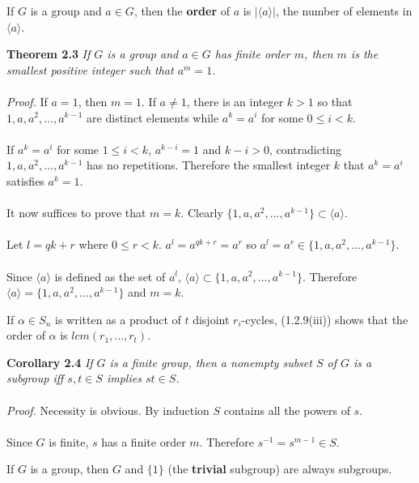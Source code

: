 \documentclass{article}
\begin{document}
If \(G\) is a group and \(a\in G\), then the \textbf{order} of \(a\) is \(|\langle a\rangle|\), the number of elements in \(\langle a\rangle\).\\
\begin{redrules}\color{red}
\textbf{Theorem 2.3} \textit{If \(G\) is a group and \(a\in G\) has finite order \(m\), then \(m\) is the smallest positive integer such that \(a^{m}=1\).}\\\\\color{black}
\textit{Proof.} If \(a=1\), then \(m=1\). If \(a\neq 1\), there is an integer \(k>1\) so that \(1,a,a^{2},...,a^{k-1}\) are distinct elements 
while \(a^{k}=a^{i}\) for some \(0\le i<k\).\\\\
If \(a^{k}=a^{i}\) for some \(1\le i<k\), \(a^{k-i}=1\) and \(k-i>0\), contradicting \(1,a,a^{2},...,a^{k-1}\) has no repetitions. Therefore the smallest integer \(k\) that \(a^{k}=a^{i}\) satisfies \(a^{k}=1\).\\\\
It now suffices to prove that \(m=k\). Clearly \(\{1,a,a^{2},...,a^{k-1}\}\subset\langle a\rangle\).\\\\
Let \(l=qk+r\) where \(0\le r<k\). \(a^{l}=a^{qk+r}=a^{r}\) so \(a^{l}=a^{r}\in \{1,a,a^{2},...,a^{k-1}\}\).\\\\
Since \(\langle a\rangle\) is defined as the set of \(a^{l}\), \(\langle a\rangle\subset \{1,a,a^{2},...,a^{k-1}\}\). Therefore \(\langle a\rangle=\{1,a,a^{2},...,a^{k-1}\}\) and \(m=k\).
\end{redrules}
If \(\alpha\in S_{n}\) is written as a product of \(t\) disjoint \(r_{i}\)-cycles, \color{gray}(1.2.9(iii)) \color{black}
shows that the order of \(\alpha\) is \(lcm(r_{1},...,r_{t})\).\\
\begin{greenrules}\color{OliveGreen}
\textbf{Corollary 2.4} \textit{If \(G\) is a finite group, then a nonempty subset \(S\) of \(G\) is a subgroup iff \(s,t\in S\) implies \(st\in S\).}\\\\\color{black}
\textit{Proof.} Necessity is obvious. By induction \(S\) contains all the powers of \(s\).\\\\
 Since \(G\) is finite, \(s\) has a finite order \(m\). Therefore \(s^{-1}=s^{m-1}\in S\).
\end{greenrules}
If \(G\) is a group, then \(G\) and \(\{1\}\) (the \textbf{trivial} subgroup) are always subgroups.\\\\
\end{document}
